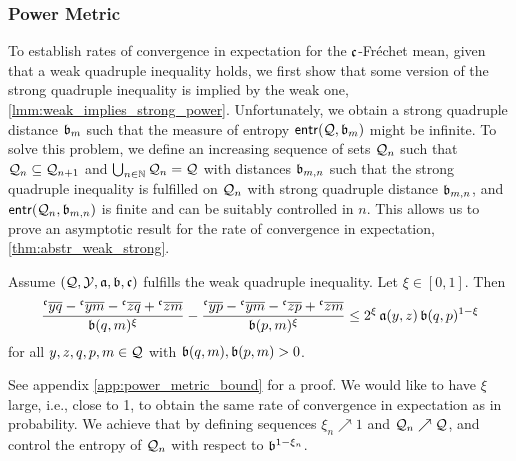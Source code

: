 \subsubsection{Power Metric}
%
To establish rates of convergence in expectation for the $\mathfrak{c}$-Fréchet mean, given that a weak quadruple inequality holds, we first show that some version of the strong quadruple inequality is implied by the weak one, \autoref{lmm:weak_implies_strong_power}. Unfortunately, we obtain a strong quadruple distance $\mathfrak{b}_m$ such that the measure of entropy $\operatorname{\mathsf{entr}}(\mathcal{Q}, \mathfrak{b}_m)$ might be infinite. To solve this problem, we define an increasing sequence of sets $\mathcal{Q}_n$ such that $\mathcal{Q}_n \subseteq \mathcal{Q}_{n+1}$ and $\bigcup_{n\in\mathbb{N}} \mathcal{Q}_n = \mathcal{Q}$
with distances $\mathfrak{b}_{m,n}$ such that the strong quadruple inequality is fulfilled on $\mathcal{Q}_n$ with strong quadruple distance $\mathfrak{b}_{m,n}$, and $\operatorname{\mathsf{entr}}(\mathcal{Q}_n, \mathfrak{b}_{m,n})$ is finite and can be suitably controlled in $n$. This allows us to prove an asymptotic result for the rate of convergence in expectation, \autoref{thm:abstr_weak_strong}.
%
\begin{lemma}\label{lmm:weak_implies_strong_power}
Assume $(\mathcal{Q}, \mathcal{Y}, \mathfrak{a}, \mathfrak{b}, \mathfrak{c})$ fulfills the weak quadruple inequality.
Let $\xi\in[0,1]$.
Then
\begin{equation}\label{eq:strquadpowerbound}
	\frac{\olc yq - \olc ym - \olc zq + \olc zm}{\mf b(q,m)^{\xi}}
	-
	\frac{\olc yp - \olc ym - \olc zp + \olc zm}{\mf b(p,m)^{\xi}}
	\leq
	2^\xi\, \mf a(y,z)\, {\mf b}(q,p)^{1-\xi}
\end{equation}
for all $y,z,q,p,m \in \mathcal{Q}$ with $\mathfrak{b}(q,m), \mathfrak{b}(p,m) > 0$.
\end{lemma}
%
See appendix \autoref{app:power_metric_bound} for a proof.
%
We would like to have $\xi$ large, i.e., close to 1, to obtain the same rate of convergence in expectation as in probability. We achieve that by defining sequences $\xi_n \nearrow 1$ and $\mathcal{Q}_n \nearrow \mathcal{Q}$, and control the entropy of $\mathcal{Q}_n$ with respect to $\mathfrak{b}^{1-\xi_n}$.

